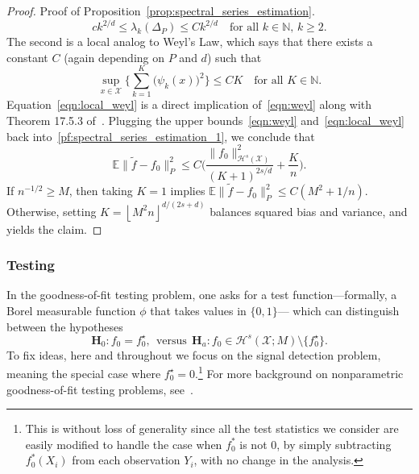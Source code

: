 \documentclass[aos]{imsart}
\theoremstyle{plain}
\theoremstyle{definition}
\theoremstyle{remark}
\newcommand{\Ebb}{\mathbb{E}}
\newcommand{\wt}[1]{\widetilde{#1}}
\newcommand{\mc}[1]{\mathcal{#1}}
\newcommand{\floor}[1]{\left\lfloor #1 \right\rfloor}
\newcommand{\1}{\mathbf{1}}
\begin{document}
\begin{proof}{Proof of Proposition~\ref{prop:spectral_series_estimation}.}
\begin{equation}
\label{eqn:weyl}
ck^{2/d} \leq \lambda_k(\Delta_P) \leq Ck^{2/d}\quad\textrm{for all $k \in \mathbb{N}$, $k \geq 2$}.
\end{equation}
The second is a local analog to Weyl's Law, which says that there exists a constant $C$ (again depending on $P$ and $d$) such that
\begin{equation}
\label{eqn:local_weyl}
\sup_{x \in \mc{X}}\biggl\{\sum_{k = 1}^{K} \bigl(\psi_k(x)\bigr)^2\biggr\} \leq CK \quad\textrm{for all $K \in \mathbb{N}$}.
\end{equation}
Equation~\eqref{eqn:local_weyl} is a direct implication of~\eqref{eqn:weyl} along with Theorem 17.5.3 of~\cite{hormander1973}. Plugging the upper bounds~\eqref{eqn:weyl} and~\eqref{eqn:local_weyl} back into~\eqref{pf:spectral_series_estimation_1}, we conclude that
\begin{equation}
\label{pf:spectral_series_estimation_3}
\Ebb \|\wt{f} - f_0\|_P^2 \leq C\biggl(\frac{\|f_0\|_{\mc{H}^s(\mc{X})}^2}{(K + 1)^{2s/d}} + \frac{K}{n}\biggr).
\end{equation}
If $n^{-1/2} \geq M$, then taking $K = 1$ implies $\Ebb \|\wt{f} - f_0\|_P^2 \leq C(M^2 + 1/n)$. Otherwise, setting $K = \floor{M^2n}^{d/(2s + d)}$ balances squared bias and variance, and yields the claim.
\end{proof}

\subsubsection{Testing}
In the goodness-of-fit testing problem, one asks for a test function---formally, a Borel measurable function $\phi$ that takes values in $\{0,1\}$--- which can distinguish between the hypotheses
\begin{equation}
\mathbf{H}_0: f_0 = f_0^{\star}, ~~\textrm{versus}~~ \mathbf{H}_a: f_0 \in \mc{H}^{s}(\mc{X};M) \setminus \{f_0^{\star}\}.
\end{equation} 
To fix ideas, here and throughout we focus on the signal detection problem, meaning the special case where $f_0^{\star} = 0$.\footnote{This is without loss of generality since all the test statistics we consider are easily modified to handle the case when $f_0^{\ast}$ is not $0$, by simply subtracting $f_0^{\ast}(X_i)$ from each observation $Y_i$, with no change in the analysis.} For more background on nonparametric goodness-of-fit testing problems, see~\cite{ingster2012}.
\end{document}

